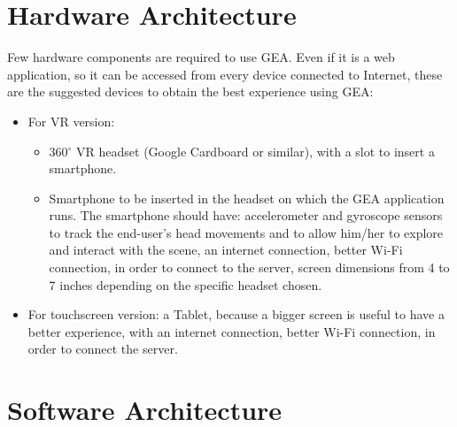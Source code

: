 \section{Hardware Architecture}
Few hardware components are required to use GEA. Even if it is a web application, so it can be accessed from every device connected to Internet, these are the suggested devices to obtain the best experience using GEA:
\begin{itemize}
\item For VR version:
\begin{itemize}
\item 360$^{\circ}$ VR headset (Google Cardboard or similar), with a slot to insert a smartphone.
\item Smartphone to be inserted in the headset on which the GEA application runs. The smartphone should have: accelerometer and gyroscope sensors to track the end-user's head movements and to allow him/her to explore and interact with the scene, an internet connection, better Wi-Fi connection, in order to connect to the server, screen dimensions from 4 to 7 inches depending on the specific headset chosen.
\end{itemize}
\item For touchscreen version: a Tablet, because a bigger screen is useful to have a better experience, with an internet connection, better Wi-Fi connection, in order to connect the server.
\end{itemize}
\section{Software Architecture}